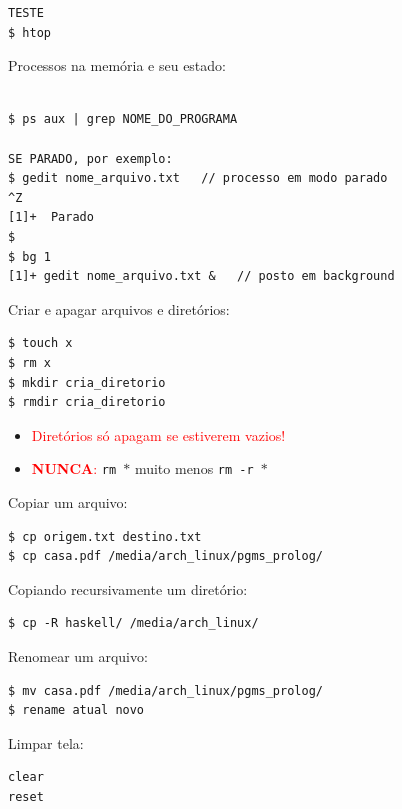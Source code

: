 \documentclass[final,a4paper]{article}
\begin{document}
\begin{description}
\begin{verbatim}
TESTE
$ htop

\end{verbatim}



\pagebreak
\item[\ding{248}] Processos na memória e seu estado:
\begin{verbatim}

$ ps aux | grep NOME_DO_PROGRAMA
 
SE PARADO, por exemplo: 
$ gedit nome_arquivo.txt   // processo em modo parado
^Z
[1]+  Parado     
$
$ bg 1
[1]+ gedit nome_arquivo.txt &   // posto em background

\end{verbatim}

\pagebreak
\item[\ding{248}] Criar e apagar arquivos  e diretórios:
\begin{verbatim}
$ touch x
$ rm x
$ mkdir cria_diretorio
$ rmdir cria_diretorio
\end{verbatim}

\begin{itemize}
  \item \textcolor{red}{Diretórios só apagam se estiverem vazios!}
   \item \textcolor{red}{\textbf{NUNCA}:} \texttt{rm $\ast$} muito menos \texttt{rm -r $\ast$}
\end{itemize}

\pagebreak
\item[\ding{248}] Copiar um arquivo:
\begin{verbatim}
$ cp origem.txt destino.txt
$ cp casa.pdf /media/arch_linux/pgms_prolog/

\end{verbatim}

\pagebreak
\item[\ding{248}] Copiando recursivamente um diretório:
\begin{verbatim}
$ cp -R haskell/ /media/arch_linux/

\end{verbatim}

\pagebreak
\item[\ding{248}] Renomear um arquivo:
\begin{verbatim}
$ mv casa.pdf /media/arch_linux/pgms_prolog/
$ rename atual novo

\end{verbatim}




\pagebreak
\item[\ding{248}] Limpar tela:
\begin{verbatim}
clear
reset


\end{verbatim}
\end{description}
\end{document}
